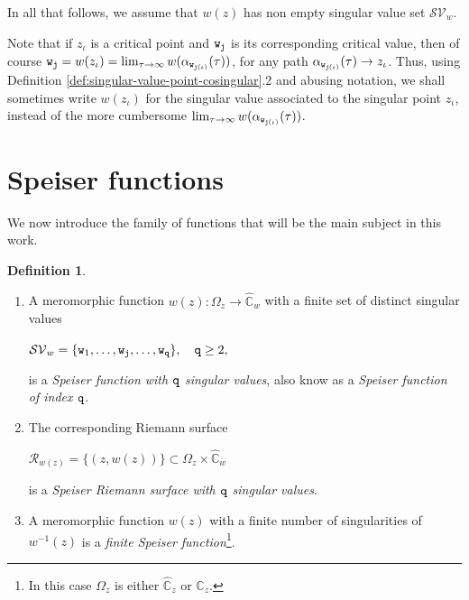 \documentclass[final,3p,times]{elsarticle}
\newcommand{\CC}{\ensuremath{{\mathbb C}}}
\newcommand{\CW}{\ensuremath{{\widehat{\mathbb C}}}}
\newcommand{\R}{\ensuremath{{\mathcal R}}}
\theoremstyle{definition}
\newtheorem{definition}[theorem]{Definition}
\begin{document}
In all that follows, we assume that $w(z)$ has
non empty singular value set $\mathcal{SV}_w$.
  
Note that if $z_\iota$ is a critical point and ${\tt w}_{\tt j}$ is its corresponding critical value, 
then of course ${\tt w}_{\tt j}= w(z_\iota)=\lim_{\tau  \to \infty} w ( \alpha_{{\tt w}_{{\tt j}(\iota)}} ( \tau ) )$,
for any path $\alpha_{{\tt w}_{{\tt j}(\iota)}} ( \tau ) \to z_\iota$.
Thus, using Definition \ref{def:singular-value-point-cosingular}.2 and abusing notation, 
we shall sometimes write 
$w(z_\iota)$ for the singular value associated to the singular point $z_\iota$, 
instead of the more cumbersome
$\lim_{\tau  \to \infty}
w ( \alpha_{{\tt w}_{{\tt j}(\iota)}} ( \tau ) )$.


\section{Speiser functions}
We now introduce the family of functions that will be the main subject in this work.
\begin{definition}
\label{def:Speiser-q-function}
\
\begin{enumerate}[label=\arabic*),leftmargin=*] 
\item
A  meromorphic function $w(z): \Omega_z \longrightarrow \CW_w$
with a finite set of
distinct singular values

\centerline{$
\mathcal{SV}_w=
\{{\tt w}_1, \ldots, {\tt w}_{\tt j}, \ldots, {\tt w}_{\tt q} \},
\ \ \ 
{\tt q} \geq 2 ,
$}

\noindent 
is a \emph{Speiser function with $\tt q$ singular values},
also know as a \emph{Speiser function of index $\tt q$}.

\item
The corresponding Riemann surface

\centerline{$
\R_{w(z)} = \{ (z, w(z))\} \subset \Omega_z \times \CW_w
$}

\noindent
is a \emph{Speiser Riemann surface with $\tt q$ singular values}. 

\item A meromorphic function 
$w(z)$ with a finite number of singularities of $w^{-1}(z)$ is a
\emph{finite Speiser function}\footnote{
In this case $\Omega_z$ is either $\CW_z$ or $\CC_z$.
}.
\end{enumerate}
\end{definition}
\end{document}
